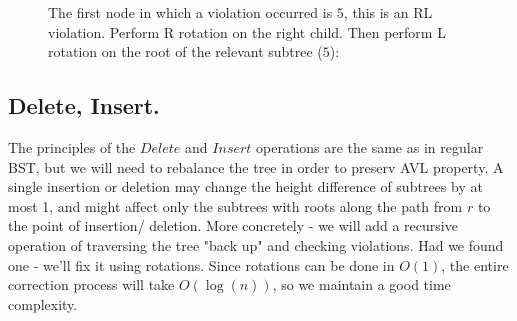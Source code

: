 \begin{figure}[h]
  \centering
  \begin{subfigure}[b]{0.31\textwidth}
  \end{subfigure}
\begin{subfigure}[b]{0.31\textwidth}
  \end{subfigure}
\begin{subfigure}[b]{0.31\textwidth}

\end{subfigure}
  \caption{ 
The first node in which a violation occurred is $5$, this is an RL violation.
Perform R rotation on the right child. Then perform L rotation on the root of the relevant subtree ($5$):
}
\end{figure}
\subsection{Delete, Insert.}
The principles of the $Delete$ and $Insert$ operations are the same as in
regular BST, but we will need to rebalance the tree in order to preserv AVL
property.
A single insertion or deletion may change the height difference of subtrees
by at most 1, and might affect only the subtrees with roots along the path
from $r$ to the point of insertion/ deletion.
More concretely - we will add a recursive operation of traversing the tree
"back up" and checking violations. Had we found one - we'll fix it using
rotations. Since rotations can be done in $O(1)$, the entire correction
process will take $O(\log(n))$, so we maintain a good time complexity.


